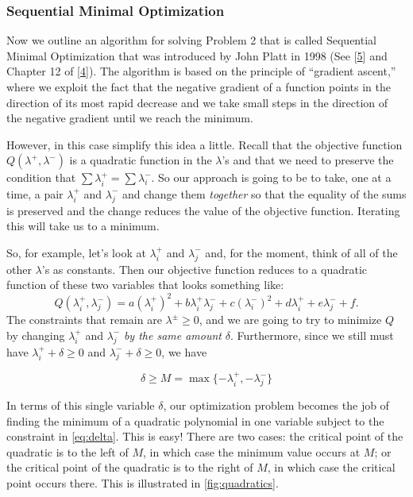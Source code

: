 \documentclass[
]{article}
\begin{document}
\hypertarget{sequential-minimal-optimization}{%
\subsubsection{Sequential Minimal
Optimization}\label{sequential-minimal-optimization}}

Now we outline an algorithm for solving Problem 2 that is called
Sequential Minimal Optimization that was introduced by John Platt in
1998 (See {[}\protect\hyperlink{ref-plattSMO}{5}{]} and Chapter 12 of
{[}\protect\hyperlink{ref-KernelMethodAdvances}{4}{]}). The algorithm is
based on the principle of ``gradient ascent,'' where we exploit the fact
that the negative gradient of a function points in the direction of its
most rapid decrease and we take small steps in the direction of the
negative gradient until we reach the minimum.

However, in this case simplify this idea a little. Recall that the
objective function \(Q(\lambda^{+},\lambda^{-})\) is a quadratic
function in the \(\lambda\)'s and that we need to preserve the condition
that \(\sum \lambda^{+}_{i}=\sum\lambda^{-}_{i}\). So our approach is
going to be to take, one at a time, a pair \(\lambda^{+}_{i}\) and
\(\lambda^{-}_{j}\) and change them \emph{together} so that the equality
of the sums is preserved and the change reduces the value of the
objective function. Iterating this will take us to a minimum.

So, for example, let's look at \(\lambda^{+}_i\) and \(\lambda^{-}_{j}\)
and, for the moment, think of all of the other \(\lambda\)'s as
constants. Then our objective function reduces to a quadratic function
of these two variables that looks something like: \[
Q(\lambda_{i}^{+},\lambda_{j}^{-}) = a(\lambda^{+}_i)^2+b\lambda^{+}_i\lambda^{-}_j+c(\lambda^{-}_{i})^2+d\lambda^{+}_i+e\lambda^{-}_{j}+f.
\] The constraints that remain are \(\lambda^{\pm}\ge 0\), and we are
going to try to minimize \(Q\) by changing \(\lambda_{i}^{+}\) and
\(\lambda_{j}^{-}\) \emph{by the same amount} \(\delta\). Furthermore,
since we still must have \(\lambda_{i}^{+}+\delta\ge 0\) and
\(\lambda_{j}^{-}+\delta\ge 0\), we have

\begin{equation}
\delta\ge M=\max\{-\lambda_{i}^{+},-\lambda_{j}^{-}\}
\label{eq:delta}\end{equation}

In terms of this single variable \(\delta\), our optimization problem
becomes the job of finding the minimum of a quadratic polynomial in one
variable subject to the constraint in \cref{eq:delta}. This is easy!
There are two cases: the critical point of the quadratic is to the left
of \(M\), in which case the minimum value occurs at \(M\); or the
critical point of the quadratic is to the right of \(M\), in which case
the critical point occurs there. This is illustrated in
\cref{fig:quadratics}.
\end{document}
